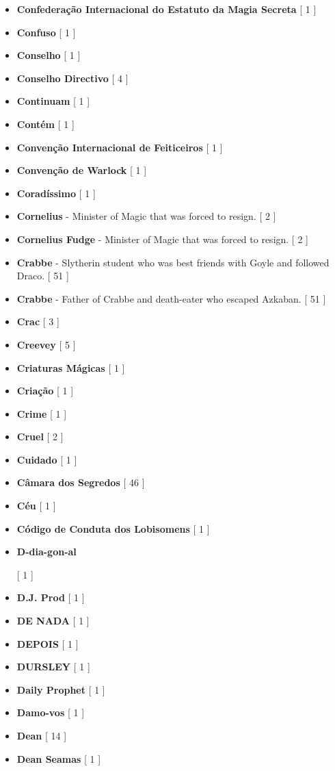 \documentclass[a4paper]{article}
\begin{document}
\begin{itemize}
	\item \textbf{Confederação Internacional do Estatuto da Magia Secreta} [ 1 ]
	\item \textbf{Confuso} [ 1 ]
	\item \textbf{Conselho} [ 1 ]
	\item \textbf{Conselho Directivo} [ 4 ]
	\item \textbf{Continuam} [ 1 ]
	\item \textbf{Contém} [ 1 ]
	\item \textbf{Convenção Internacional de Feiticeiros} [ 1 ]
	\item \textbf{Convenção de Warlock} [ 1 ]
	\item \textbf{Coradíssimo} [ 1 ]
	\item \textbf{Cornelius} - Minister of Magic that was forced to resign. [ 2 ]
	\item \textbf{Cornelius Fudge} - Minister of Magic that was forced to resign. [ 2 ]
	\item \textbf{Crabbe} - Slytherin student who was best friends with Goyle and followed Draco. [ 51 ]
	\item \textbf{Crabbe} - Father of Crabbe and death-eater who escaped Azkaban. [ 51 ]
	\item \textbf{Crac} [ 3 ]
	\item \textbf{Creevey} [ 5 ]
	\item \textbf{Criaturas Mágicas} [ 1 ]
	\item \textbf{Criação} [ 1 ]
	\item \textbf{Crime} [ 1 ]
	\item \textbf{Cruel} [ 2 ]
	\item \textbf{Cuidado} [ 1 ]
	\item \textbf{Câmara dos Segredos} [ 46 ]
	\item \textbf{Céu} [ 1 ]
	\item \textbf{Código de Conduta dos Lobisomens} [ 1 ]
	\item \hypertarget{D}{\textbf{D-dia-gon-al}} [ 1 ]
	\item \textbf{D.J. Prod} [ 1 ]
	\item \textbf{DE NADA} [ 1 ]
	\item \textbf{DEPOIS} [ 1 ]
	\item \textbf{DURSLEY} [ 1 ]
	\item \textbf{Daily Prophet} [ 1 ]
	\item \textbf{Damo-vos} [ 1 ]
	\item \textbf{Dean} [ 14 ]
	\item \textbf{Dean Seamas} [ 1 ]

\end{itemize}
\end{document}
